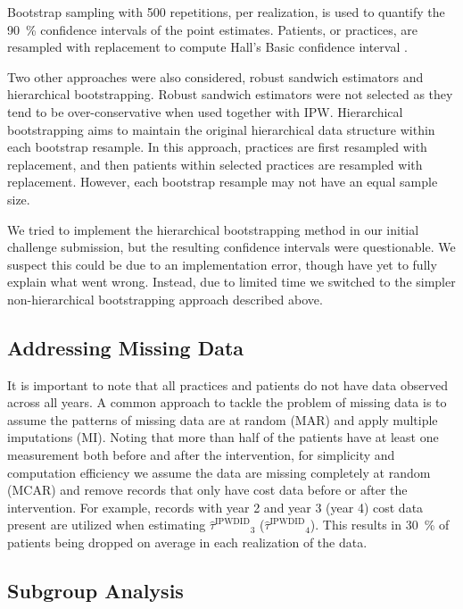 \documentclass[twoside,11pt]{article}
\newcommand*{\IPW}{\ensuremath{\text{IPW}}\xspace}
\newcommand*{\IPWDID}{\ensuremath{\text{IPWDID}}\xspace}
\newcommand*{\ATTestIPWDID}{\ensuremath{\hat{\tau}^{\IPWDID}}\xspace}
\begin{document}
Bootstrap sampling with \num{500} repetitions, per realization, is used to quantify
the \SI{90}{\percent} confidence intervals of the point estimates.
Patients, or practices, are resampled with replacement to compute
Hall's Basic confidence interval \cite{10.2307/2241604}.

Two other approaches were also considered,
robust sandwich estimators and hierarchical bootstrapping.
Robust sandwich estimators were not selected as they
tend to be over-conservative when used together with \IPW \cite{10.1002/sim.7084}.
Hierarchical bootstrapping \cite{davison_hinkley_1997}
aims to maintain the original hierarchical data structure within each bootstrap resample.
In this approach, practices are first resampled with replacement,
and then patients within selected practices are resampled with replacement.
However, each bootstrap resample may not have an equal sample size.

We tried to implement the hierarchical bootstrapping method in our initial challenge submission,
but the resulting confidence intervals were questionable.
We suspect this could be due to an implementation error,
though have yet to fully explain what went wrong.
Instead, due to limited time we switched to
the simpler non-hierarchical bootstrapping approach described above.

\subsection{Addressing Missing Data}
\label{method:missing_data}

It is important to note that all practices and patients do not have data observed across all years.
A common approach to tackle the problem of missing data
is to assume the patterns of missing data are at random (MAR)
and apply multiple imputations (MI).
Noting that more than half of the patients have at least one
measurement both before and after the intervention,
for simplicity and computation efficiency we assume the data are missing completely at random (MCAR)
and remove records that only have cost data before or after the intervention.
For example, records with year 2 and year 3 (year 4) cost data present
are utilized when estimating $\ATTestIPWDID_{3}$ ($\ATTestIPWDID_{4}$).
This results in \SI{30}{\percent} of patients being dropped
on average in each realization of the data.

\subsection{Subgroup Analysis}
\label{method:subgroup_ana}
\end{document}

